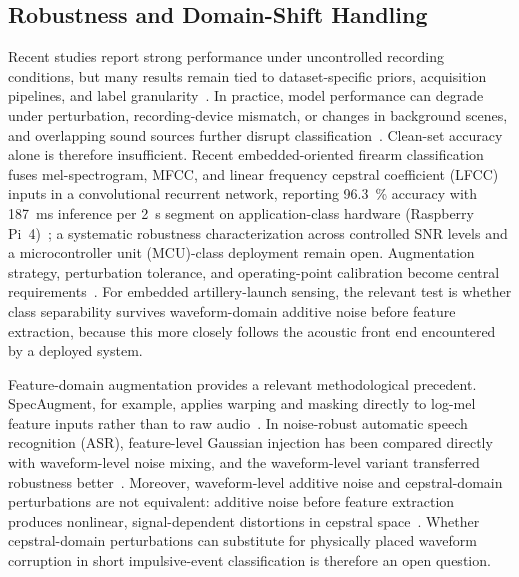 ﻿\documentclass[conference]{IEEEtran}
\begin{document}
\subsection{Robustness and Domain-Shift Handling}
Recent studies report strong performance under uncontrolled recording conditions, but many results remain tied to dataset-specific priors, acquisition pipelines, and label granularity~\cite{khan2010embedding,raponi2022sound_of_guns,svatos2024fcc}. In practice, model performance can degrade under perturbation, recording-device mismatch, or changes in background scenes, and overlapping sound sources further disrupt classification~\cite{ye2019multi_sound}. Clean-set accuracy alone is therefore insufficient. Recent embedded-oriented firearm classification fuses mel-spectrogram, MFCC, and linear frequency cepstral coefficient (LFCC) inputs in a convolutional recurrent network, reporting 96.3~\% accuracy with 187~ms inference per 2~s segment on application-class hardware (Raspberry Pi~4)~\cite{elkarous2025firearm}; a systematic robustness characterization across controlled SNR levels and a microcontroller unit (MCU)-class deployment remain open. Augmentation strategy, perturbation tolerance, and operating-point calibration become central requirements~\cite{salamon2017esc_aug}. For embedded artillery-launch sensing, the relevant test is whether class separability survives waveform-domain additive noise before feature extraction, because this more closely follows the acoustic front end encountered by a deployed system.

Feature-domain augmentation provides a relevant methodological precedent. SpecAugment, for example, applies warping and masking directly to log-mel feature inputs rather than to raw audio~\cite{park2019specaugment}. In noise-robust automatic speech recognition (ASR), feature-level Gaussian injection has been compared directly with waveform-level noise mixing, and the waveform-level variant transferred robustness better~\cite{braun2017accan}. Moreover, waveform-level additive noise and cepstral-domain perturbations are not equivalent: additive noise before feature extraction produces nonlinear, signal-dependent distortions in cepstral space~\cite{delatorre2002nonlinear_feature_space}. Whether cepstral-domain perturbations can substitute for physically placed waveform corruption in short impulsive-event classification is therefore an open question.
\end{document}

